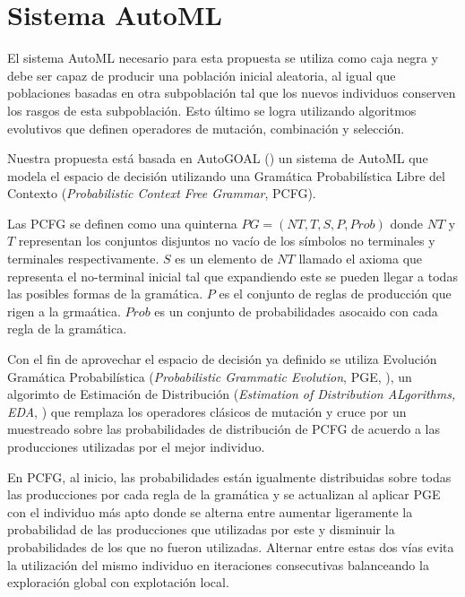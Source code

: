 \section{Sistema AutoML}
El sistema AutoML necesario para esta propuesta se utiliza como caja negra y debe ser capaz de producir una poblaci\'on inicial aleatoria, al igual que poblaciones basadas en otra subpoblaci\'on tal que los nuevos individuos conserven los rasgos de esta subpoblaci\'on. Esto \'ultimo se logra utilizando algoritmos evolutivos que definen operadores de mutaci\'on, combinaci\'on y selecci\'on.

Nuestra propuesta est\'a basada en AutoGOAL (\cite{estevez2020solving}) un sistema de AutoML que modela el espacio de decisi\'on utilizando una Gram\'atica Probabil\'istica  Libre del Contexto (\textit{Probabilistic Context Free Grammar}, PCFG). 

Las PCFG se definen como una quinterna $PG = (NT, T, S, P, Prob)$ donde $NT$ y $T$ representan los conjuntos disjuntos no vac\'io de los s\'imbolos no terminales y terminales respectivamente. $S$ es un elemento de $NT$ llamado el axioma que representa el no-terminal inicial tal que expandiendo este se pueden llegar a todas las posibles formas de la gram\'atica. $P$ es el conjunto de reglas de producci\'on que rigen a la grma\'atica. $Prob$  es un conjunto de probabilidades asocaido con cada regla de la gram\'atica. 

Con el fin de aprovechar el espacio de decisi\'on ya definido se utiliza Evoluci\'on Gram\'atica Probabil\'istica (\textit{Probabilistic Grammatic Evolution}, PGE, \cite{megane2021probabilistic}), un algorimto de Estimaci\'on de Distribuci\'on (\textit{Estimation of Distribution ALgorithms, EDA}, \cite{larranaga2001estimation}) que remplaza los operadores cl\'asicos de mutaci\'on y cruce por un muestreado sobre las probabilidades de distribuci\'on de PCFG de acuerdo a las producciones utilizadas por el mejor individuo.

En PCFG, al inicio, las probabilidades est\'an igualmente distribuidas sobre todas las producciones por cada regla de la gram\'atica y se actualizan al aplicar PGE con el individuo m\'as apto donde se alterna entre aumentar ligeramente la probabilidad de las producciones que utilizadas por este y disminuir la probabilidades de los que no fueron utilizadas. Alternar entre estas dos v\'ias evita la utilizaci\'on del mismo individuo en iteraciones consecutivas balanceando la exploraci\'on global con explotaci\'on local.

